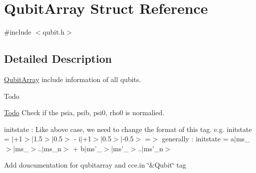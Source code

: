 \hypertarget{structQubitArray}{\section{Qubit\-Array Struct Reference}
\label{structQubitArray}
}


{\ttfamily \#include $<$qubit.\-h$>$}



\subsection{Detailed Description}
\hyperlink{structQubitArray}{Qubit\-Array} include information of all qubits. 

\begin{DoxyRefDesc}{Todo}
\item[\hyperlink{todo__todo000013}{Todo}]Check if the psia, psib, psi0, rho0 is normalied. 

initstate \-: Like above case, we need to change the format of this tag. e.\-g. initstate = $|$+1$>$$|$1.5$>$$|$0.5$>$ -\/ i$|$+1$>$$|$0.5$>$$|$-\/0.5$>$ =$>$ generally \-: initstate = a$|$ms\-\_$>$$|$ms\-\_$>$..$|$ms\-\_\-n$>$ + b$|$ms'\-\_$>$$|$ms'\-\_$>$..$|$ms'\-\_\-n$>$ 

Add doucumentation for qubitarray and cce.\-in \char`\"{}\&\-Qubit\char`\"{} tag \end{DoxyRefDesc}


